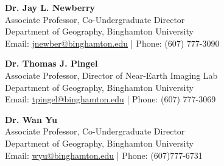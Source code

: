 \documentclass[11pt]{article}
\begin{document}
\vspace{2mm}
\noindent
\textbf{Dr. Jay L. Newberry} \\
Associate Professor, Co-Undergraduate Director \\
Department of Geography, Binghamton University \\
Email: \href{mailto:jnewber@binghamton.edu}{jnewber@binghamton.edu} | Phone: (607) 777-3090

\vspace{2mm}
\noindent
\textbf{Dr. Thomas J. Pingel} \\
Associate Professor, Director of Near-Earth Imaging Lab \\
Department of Geography, Binghamton University \\
Email: \href{mailto:tpingel@binghamton.edu}{tpingel@binghamton.edu} \quad | \quad Phone: (607) 777-3069

\vspace{2mm}
\noindent
\textbf{Dr. Wan Yu} \\
Associate Professor, Co-Undergraduate Director \\
Department of Geography, Binghamton University \\
Email: \href{mailto:wyu@binghamton.edu}{wyu@binghamton.edu} \quad | \quad Phone: (607)777-6731
\end{document}
